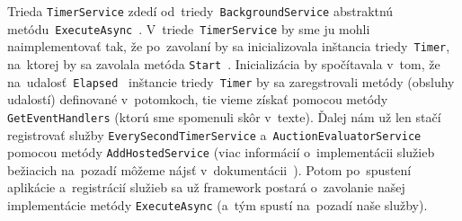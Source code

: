 Trieda \verb|TimerService| zdedí od~triedy~\verb|BackgroundService| abstraktnú metódu~\verb|ExecuteAsync|~\cite{executeasync}. V~triede~\verb|TimerService| by sme ju mohli naimplementovať tak, že po~zavolaní by sa inicializovala inštancia triedy~\verb|Timer|, na~ktorej by sa zavolala metóda \texttt{Start}~\cite{start}. Inicializácia by spočítavala v~tom, že na~udalosť~\verb|Elapsed|~\cite{elapsed} inštancie triedy~\verb|Timer| by sa zaregstrovali metódy (obsluhy udalostí) definované v~potomkoch, tie vieme získať pomocou metódy \verb|GetEventHandlers| (ktorú sme spomenuli skôr v~texte). Ďalej nám už len stačí registrovať služby \verb|EverySecondTimerService| a~\verb|AuctionEvaluatorService| pomocou metódy \verb|AddHostedService| (viac informácií o~implementácii služieb bežiacich na~pozadí môžeme nájsť v~dokumentácii~\cite{addhostedservice}). Potom po~spustení aplikácie a~registrácií služieb sa už framework postará o~zavolanie našej implementácie metódy \verb|ExecuteAsync| (a~tým spustí na~pozadí naše služby).

